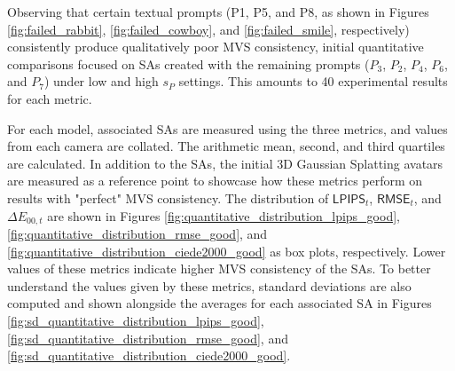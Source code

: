 Observing that certain textual prompts (P1, P5, and P8, as shown in Figures \ref{fig:failed_rabbit}, \ref{fig:failed_cowboy}, and \ref{fig:failed_smile}, respectively) consistently produce qualitatively poor MVS consistency, initial quantitative comparisons focused on SAs created with the remaining prompts ($P_3$, $P_2$, $P_4$, $P_6$, and $P_7$) under low and high $s_P$ settings. This amounts to 40 experimental results for each metric.

For each model, associated SAs are measured using the three metrics, and values from each camera are collated. The arithmetic mean, second, and third quartiles are calculated. In addition to the SAs, the initial 3D Gaussian Splatting avatars are measured as a reference point to showcase how these metrics perform on results with "perfect" MVS consistency. The distribution of $\mathsf{LPIPS}_{t}$, $\mathsf{RMSE}_{t}$, and $\Delta E_{00,t}$ are shown in Figures \ref{fig:quantitative_distribution_lpips_good}, \ref{fig:quantitative_distribution_rmse_good}, and \ref{fig:quantitative_distribution_ciede2000_good} as box plots, respectively. Lower values of these metrics indicate higher MVS consistency of the SAs. To better understand the values given by these metrics, standard deviations are also computed and shown alongside the averages for each associated SA in Figures \ref{fig:sd_quantitative_distribution_lpips_good}, \ref{fig:sd_quantitative_distribution_rmse_good}, and \ref{fig:sd_quantitative_distribution_ciede2000_good}.

